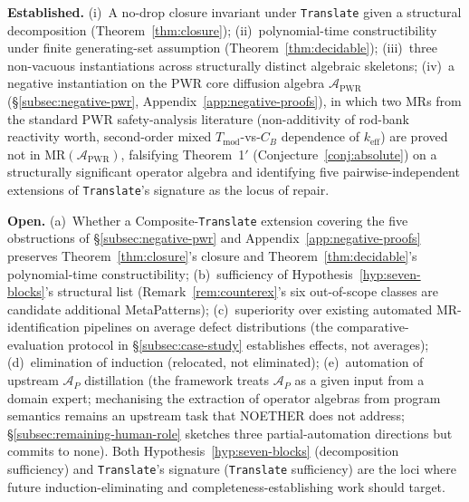 \documentclass[acmsmall,screen,review]{acmart}
\begin{document}
\begin{tcolorbox}[breakable,colback=gray!5,colframe=black!50,arc=2pt,boxrule=0.5pt,fontupper=\small,title=Established and open,fonttitle=\small\bfseries]
\textbf{Established.} (i)~A no-drop closure invariant under \texttt{Translate}
given a structural decomposition (Theorem~\ref{thm:closure}); (ii)~polynomial-time
constructibility under finite generating-set assumption (Theorem~\ref{thm:decidable});
(iii)~three non-vacuous instantiations across structurally distinct algebraic
skeletons; (iv)~a negative instantiation on the PWR core diffusion algebra
$\mathcal{A}_{\mathrm{PWR}}$ (\S\ref{subsec:negative-pwr},
Appendix~\ref{app:negative-proofs}), in which two MRs from the standard PWR
safety-analysis literature (non-additivity of rod-bank reactivity worth,
second-order mixed $T_{\mathrm{mod}}$-vs-$C_B$ dependence of $k_{\mathrm{eff}}$)
are proved not in $\mathrm{MR}(\mathcal{A}_{\mathrm{PWR}})$, falsifying
Theorem~1$'$ (Conjecture~\ref{conj:absolute}) on a structurally significant
operator algebra and identifying five pairwise-independent extensions of
\texttt{Translate}'s signature as the locus of repair.

\textbf{Open.} (a)~Whether a Composite-\texttt{Translate} extension covering the five obstructions of \S\ref{subsec:negative-pwr} and Appendix~\ref{app:negative-proofs} preserves Theorem~\ref{thm:closure}'s closure and Theorem~\ref{thm:decidable}'s polynomial-time constructibility; (b)~sufficiency of Hypothesis~\ref{hyp:seven-blocks}'s structural list (Remark~\ref{rem:counterex}'s six out-of-scope classes are candidate additional MetaPatterns); (c)~superiority over existing automated MR-identification pipelines on average defect distributions (the comparative-evaluation protocol in \S\ref{subsec:case-study} establishes effects, not averages); (d)~elimination of induction (relocated, not eliminated); (e)~automation of upstream $\mathcal{A}_P$ distillation (the framework treats $\mathcal{A}_P$ as a given input from a domain expert; mechanising the extraction of operator algebras from program semantics remains an upstream task that NOETHER does not address; \S\ref{subsec:remaining-human-role} sketches three partial-automation directions but commits to none). Both Hypothesis~\ref{hyp:seven-blocks} (decomposition sufficiency) and \texttt{Translate}'s signature (\texttt{Translate} sufficiency) are the loci where future induction-eliminating and completeness-establishing work should target.
\end{tcolorbox}
\end{document}
